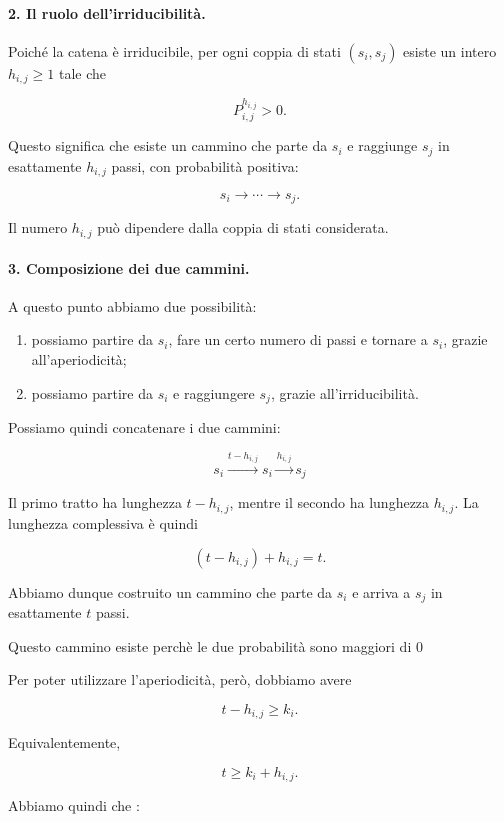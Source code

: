\paragraph{2. Il ruolo dell'irriducibilità.}

Poiché la catena è irriducibile, per ogni coppia di stati $(s_i,s_j)$ esiste un intero $h_{i,j}\geq1$ tale che

$$
P^{h_{i,j}}_{i,j}>0.
$$

Questo significa che esiste un cammino che parte da $s_i$ e raggiunge $s_j$ in esattamente $h_{i,j}$ passi, con probabilità positiva:

$$
s_i
\longrightarrow \cdots \longrightarrow
s_j.
$$

Il numero $h_{i,j}$ può dipendere dalla coppia di stati considerata.

\paragraph{3. Composizione dei due cammini.}

A questo punto abbiamo due possibilità:

\begin{enumerate}
\item possiamo partire da $s_i$, fare un certo numero di passi e tornare a $s_i$, grazie all'aperiodicità;
\item possiamo partire da $s_i$ e raggiungere $s_j$, grazie all'irriducibilità.
\end{enumerate}

Possiamo quindi concatenare i due cammini:

$$
\boxed{
s_i
\overset{t-h_{i,j}}{\longrightarrow}
s_i
\overset{h_{i,j}}{\longrightarrow}
s_j
}
$$

Il primo tratto ha lunghezza $t-h_{i,j}$, mentre il secondo ha lunghezza $h_{i,j}$. La lunghezza complessiva è quindi

$$
(t-h_{i,j})+h_{i,j}=t.
$$

Abbiamo dunque costruito un cammino che parte da $s_i$ e arriva a $s_j$ in esattamente $t$ passi. 

Questo cammino esiste perchè le due probabilità sono maggiori di 0

Per poter utilizzare l'aperiodicità, però, dobbiamo avere

$$
t-h_{i,j}\geq k_i.
$$

Equivalentemente,

$$
\boxed{
t\geq k_i+h_{i,j}.
}
$$

Abbiamo quindi che :

